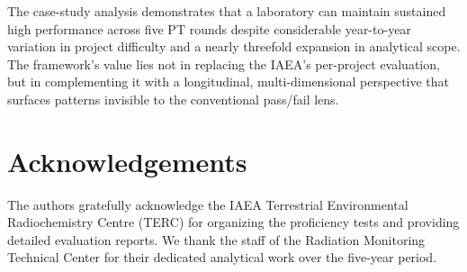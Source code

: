 \documentclass[12pt,a4paper,twoside]{article}
\begin{document}
The case-study analysis demonstrates that a laboratory can maintain sustained high performance across five PT rounds despite considerable year-to-year variation in project difficulty and a nearly threefold expansion in analytical scope. The framework's value lies not in replacing the IAEA's per-project evaluation, but in complementing it with a longitudinal, multi-dimensional perspective that surfaces patterns invisible to the conventional pass/fail lens.

\section*{Acknowledgements}
The authors gratefully acknowledge the IAEA Terrestrial Environmental Radiochemistry Centre (TERC) for organizing the proficiency tests and providing detailed evaluation reports. We thank the staff of the Radiation Monitoring Technical Center for their dedicated analytical work over the five-year period.




\end{document}
